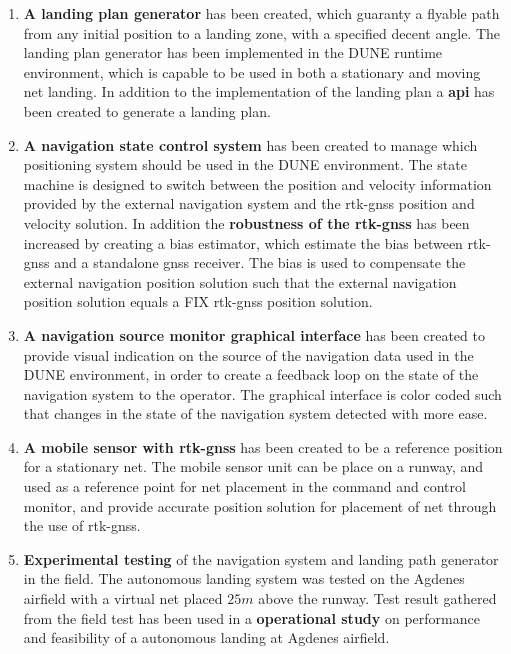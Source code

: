 \begin{enumerate}
\item \textbf{A landing plan generator} has been created, which guaranty a flyable path from any initial position to a landing zone, with a specified decent angle. The landing plan generator has been implemented in the DUNE runtime environment, which is capable to be used in both a stationary and moving net landing. In addition to the implementation of the landing plan a \textbf{\gls{api}} has been created to generate a landing plan.
\item \textbf{A navigation state control system} has been created to manage which positioning system should be used in the DUNE environment. The state machine is designed to switch between the position and velocity information provided by the external navigation system and the \gls{rtk-gnss} position and velocity solution. In addition the \textbf{robustness of the \gls{rtk-gnss}} has been increased by creating a bias estimator, which estimate the bias between \gls{rtk-gnss} and a standalone \gls{gnss} receiver. The bias is used to compensate the external navigation position solution such that the external navigation position solution equals a FIX \gls{rtk-gnss} position solution.
\item \textbf{A navigation source monitor graphical interface} has been created to provide visual indication on the source of the navigation data used in the DUNE environment, in order to create a feedback loop on the state of the navigation system to the operator. The graphical interface is color coded such that changes in the state of the navigation system detected with more ease.
\item \textbf{A mobile sensor with \gls{rtk-gnss}} has been created to be a reference position for a stationary net. The mobile sensor unit can be place on a runway, and used as a reference point for net placement in the command and control monitor, and provide accurate position solution for placement of net through the use of \gls{rtk-gnss}.
\item \textbf{Experimental testing} of the navigation system and landing path generator in the field. The autonomous landing system was tested on the Agdenes airfield with a virtual net placed $25 m$ above the runway. Test result gathered from the field test has been used in a \textbf{operational study} on performance and  feasibility of a autonomous landing at Agdenes airfield.
\end{enumerate}
